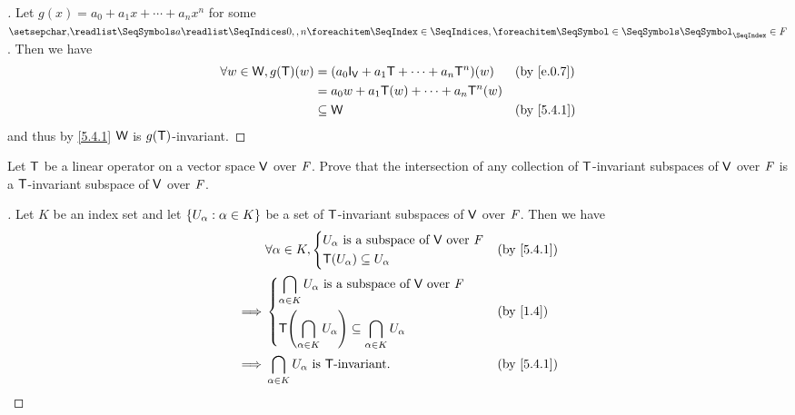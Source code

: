 \begin{proof}[]
  Let \(g(x) = a_0 + a_1 x + \cdots + a_n x^n\) for some \(\seq{a}{0,,n} \in \F\).
  Then we have
  \begin{align*}
    \forall w \in \W, g(\T)(w) & = (a_0 \IT[\V] + a_1 \T + \cdots + a_n \T^n)(w) &  & \text{(by \cref{e.0.7})} \\
                               & = a_0 w + a_1 \T(w) + \cdots + a_n \T^n(w)                                    \\
                               & \subseteq \W                                    &  & \text{(by \cref{5.4.1})}
  \end{align*}
  and thus by \cref{5.4.1} \(\mathsf{W}\) is \(g(\mathsf{T})\)-invariant.
\end{proof}

\begin{ex}\label{ex:5.4.5}
  Let \(\mathsf{T}\) be a linear operator on a vector space \(\mathsf{V}\) over \(\mathit{F}\).
  Prove that the intersection of any collection of \(\mathsf{T}\)-invariant subspaces of \(\mathsf{V}\) over \(\mathit{F}\) is a \(\mathsf{T}\)-invariant subspace of \(\mathsf{V}\) over \(\mathit{F}\).
\end{ex}

\begin{proof}[]
  Let \(K\) be an index set and let \(\left\lbrace U_{\alpha} : \alpha \in K\right\rbrace\) be a set of \(\mathsf{T}\)-invariant subspaces of \(\mathsf{V}\) over \(\mathit{F}\).
  Then we have
  \begin{align*}
             & \forall \alpha \in K, \begin{dcases}
                                       U_{\alpha} \text{ is a subspace of } \V \text{ over } \F \\
                                       \T(U_{\alpha}) \subseteq U_{\alpha}
                                     \end{dcases}                                               &  & \text{(by \cref{5.4.1})}                          \\
    \implies & \begin{dcases}
                 \bigcap_{\alpha \in K} U_{\alpha} \text{ is a subspace of } \V \text{ over } \F \\
                 \T\pa{\bigcap_{\alpha \in K} U_{\alpha}} \subseteq \bigcap_{\alpha \in K} U_{\alpha}
               \end{dcases} &  & \text{(by \cref{1.4})}                                \\
    \implies & \bigcap_{\alpha \in K} U_{\alpha} \text{ is } \T\text{-invariant}.                                        &  & \text{(by \cref{5.4.1})}
  \end{align*}
\end{proof}

